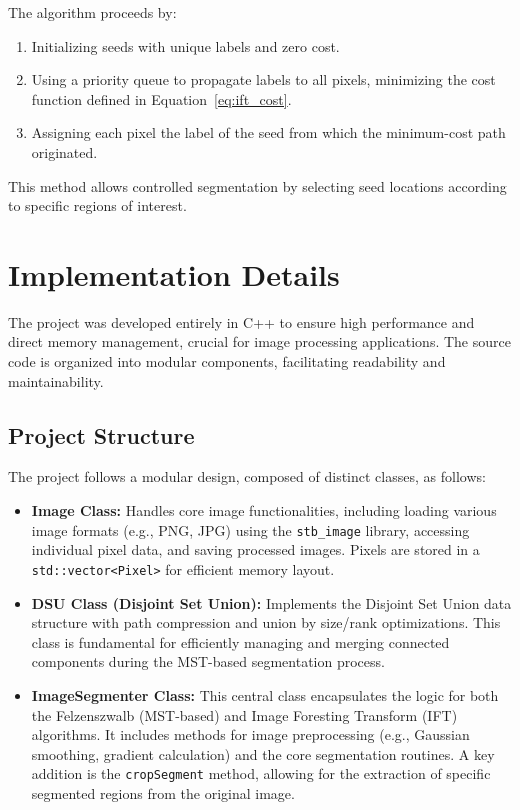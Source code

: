 \documentclass{sbc2023}
\begin{document}
The algorithm proceeds by:

\begin{enumerate}
    \item Initializing seeds with unique labels and zero cost.
    \item Using a priority queue to propagate labels to all pixels, minimizing the cost function defined in Equation~\ref{eq:ift_cost}.
    \item Assigning each pixel the label of the seed from which the minimum-cost path originated.
\end{enumerate}

This method allows controlled segmentation by selecting seed locations according to specific regions of interest.

\section{Implementation Details}
\label{sec:implementation}

The project was developed entirely in C++  to ensure high performance and direct memory management, crucial for image processing applications. The source code is organized into modular components, facilitating readability and maintainability.

\subsection{Project Structure}

The project follows a modular design, composed of distinct classes, as follows:

\begin{itemize}
    \item \textbf{Image Class:} Handles core image functionalities, including loading various image formats (e.g., PNG, JPG) using the \texttt{stb\_image} library, accessing individual pixel data, and saving processed images. Pixels are stored in a \texttt{std::vector<Pixel>} for efficient memory layout.

    \item \textbf{DSU Class (Disjoint Set Union):} Implements the Disjoint Set Union data structure with path compression and union by size/rank optimizations. This class is fundamental for efficiently managing and merging connected components during the MST-based segmentation process.

    \item \textbf{ImageSegmenter Class:} This central class encapsulates the logic for both the Felzenszwalb (MST-based) and Image Foresting Transform (IFT) algorithms. It includes methods for image preprocessing (e.g., Gaussian smoothing, gradient calculation) and the core segmentation routines. A key addition is the \texttt{cropSegment} method, allowing for the extraction of specific segmented regions from the original image.
\end{itemize}
\end{document}
